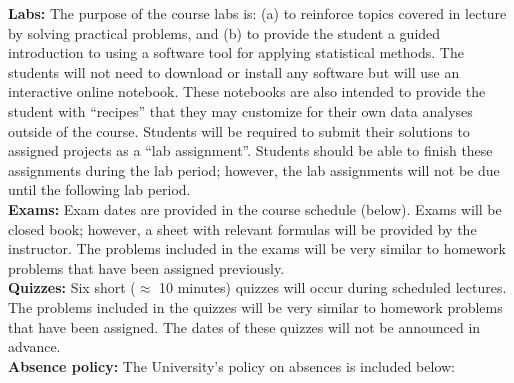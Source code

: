 \documentclass{article}
\begin{document}
\noindent\textbf{Labs:} The purpose of the course labs is: (a) to reinforce topics covered in lecture by solving practical problems, and (b) to provide the student a guided introduction to using a software tool for applying statistical methods. The students will not need to download or install any software but will use an interactive online notebook. These notebooks are also intended to provide the student with ``recipes'' that they may customize for their own data analyses outside of the course. Students will be required to submit their solutions to assigned projects as a ``lab assignment''. Students should be able to finish these assignments during the lab period; however, the lab assignments will not be due until the following lab period.  \\

\noindent\textbf{Exams:} Exam dates are provided in the course schedule (below). Exams will be closed book; however, a sheet with relevant formulas will be provided by the instructor. The problems included in the exams will be very similar to homework problems that have been assigned previously. \\

\noindent\textbf{Quizzes:} Six short ($\approx$ 10 minutes) quizzes will occur during scheduled lectures. The problems included in the quizzes will be very similar to homework problems that have been assigned. The dates of these quizzes will not be announced in advance. \\

\noindent\textbf{Absence policy:} 
The University's policy on absences is included below:
\end{document}
